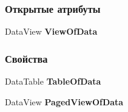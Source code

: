 \subsubsection*{Открытые атрибуты}
\begin{DoxyCompactItemize}
\item 
Data\+View {\bfseries View\+Of\+Data}\label{classkdz__manager_1_1_view_data_a67265c8fe68255aced381b1e695edb0f}

\end{DoxyCompactItemize}
\subsubsection*{Свойства}
\begin{DoxyCompactItemize}
\item 
Data\+Table {\bfseries Table\+Of\+Data}\hspace{0.3cm}{\ttfamily  [get, set]}\label{classkdz__manager_1_1_view_data_ad84722e9a8f5adae9bac98f2f7f75079}

\item 
Data\+View {\bfseries Paged\+View\+Of\+Data}\hspace{0.3cm}{\ttfamily  [get]}\label{classkdz__manager_1_1_view_data_a2ad9133ee389a2b7f848e73494695bcc}


\end{DoxyCompactItemize}

